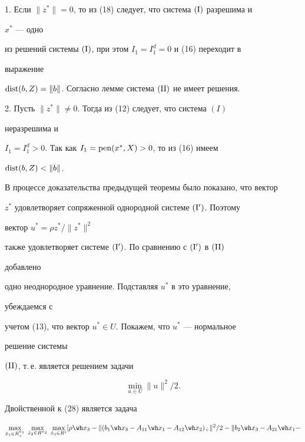 \begin{pf}


1. Если $\|z^*\|=0$, то из (18) следует, что система $(\mathrm I)$ разрешима и 


$x^*$ --- одно


из решений системы $(\mathrm I)$, при этом $I_1=I^d_1=0$ и (16) переходит в 


выражение


$\operatorname{dist}(b,Z)=\|b\|$. Согласно лемме система $(\mathrm{II})$ не имеет решения.





2. Пусть $\|z^*\|\ne0$. Тогда из (12) следует, что система $(I)$ 


неразрешима и


$I_1=I^d_1>0$. Так как $I_1=\operatorname{pen}(x^*,X)>0$, то из (16) имеем 


$\operatorname{dist}(b,Z)<\|b\|$.





В процессе доказательства предыдущей теоремы было показано, что вектор


$z^*$ удовлетворяет сопряженной однородной системе $(\mathrm I ')$. Поэтому 


вектор $u^*=\rho z^*/\|z^*\|^2$


также удовлетворяет системе $(\mathrm I ')$. По сравнению с $(\mathrm I ')$ в $(\mathrm{II})$ 


добавлено


одно неоднородное уравнение. Подставляя $u^*$ в это уравнение, 


убеждаемся с


учетом (13), что вектор $u^*\in U$. Покажем, что $u^*$ --- нормальное 


решение системы


$(\mathrm{II})$, т.\,е. является решением задачи


\begin{equation}


\min_{u\in U}\|u\|^2/2.


\end{equation}


Двойственной к (28) является задача


\begin{equation}


\max_{\Hat x_1\in R^{n_1}_+}\; \max_{\Hat x_2\in R^{n_2}}


\; \max_{\Hat x_3\in R^1}[\rho\wh x_3-\|(b_1\wh x_3-A_{11}\wh x_1-


A_{12}\wh x_2)_+\|^2/2-\|b_2\wh x_3-A_{21}\wh x_1-



\end{equation}
\end{pf}
